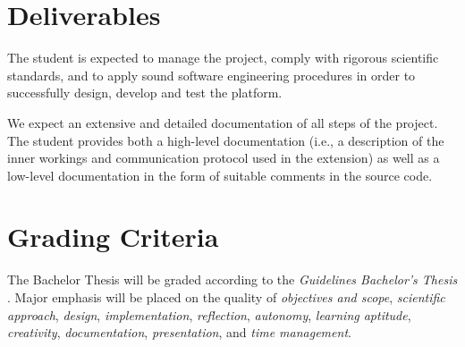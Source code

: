 \documentclass[a4paper,oneside,11pt,final]{scrartcl}
\begin{document}
\newpage

\section*{Deliverables}

\noindent The student is expected to manage the project, comply with rigorous
scientific standards, and to apply sound software engineering procedures in
order to successfully design, develop and test the platform.

\noindent We expect an extensive and detailed documentation of all steps of the
project. The student provides both a high-level documentation (i.e., a
description of the inner workings and communication protocol used in the
extension) as well as a low-level documentation in the form of suitable comments
in the source code.

\section*{Grading Criteria}
The Bachelor Thesis will be graded according to the \textit{Guidelines
Bachelor's Thesis} \cite{IR}. Major emphasis will be placed on the quality of
\textit{objectives and scope}, \textit{scientific approach}, \textit{design},
\textit{implementation}, \textit{reflection}, \textit{autonomy},
\textit{learning aptitude}, \textit{creativity}, \textit{documentation},
\textit{presentation}, and \textit{time management}.
\end{document}
